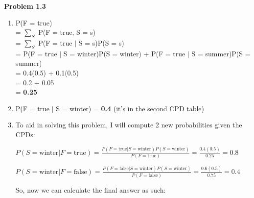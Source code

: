 \documentclass[12pt]{article}
\begin{document}
\pagebreak\textbf{Problem 1.3}
\begin{enumerate}
	\item P(F = true)\\
	= $\sum_S$ P(F = true, S = s) \\
	= $\sum_S$ P(F = true $\vert$ S = s)P(S = s) \\
	= P(F = true $\vert$ S = winter)P(S = winter) + P(F = true $\vert$ S
	= summer)P(S = summer) \\
	= 0.4(0.5) + 0.1(0.5) \\
	= 0.2 + 0.05 \\
	= \textbf{0.25} 
	\item P(F = true $\vert$ S = winter) = \textbf{0.4} (it's in the second CPD table)
	\item To aid in solving this problem, I will compute 2 new probabilities given the CPDs:
	
	$P(S = \text{winter} \vert F = \text{true}) = \frac{P(F = \text{true} \vert S = \text{winter})P(S = \text{winter})}{P(F = \text{true})} = \frac{0.4(0.5)}{0.25} = 0.8$
	
	$P(S = \text{winter} \vert F = \text{false}) = \frac{P(F = \text{false} \vert S = \text{winter})P(S = \text{winter})}{P(F = \text{false})} = \frac{0.6(0.5)}{0.75} = 0.4$
	
	So, now we can calculate the final answer as such:
	

\end{enumerate}
\end{document}
